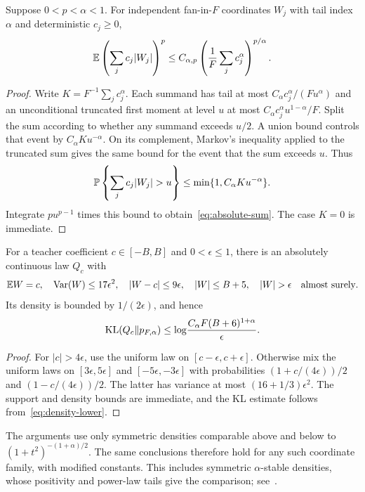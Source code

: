 \begin{lemma}\label{lem:absolute-sum}
Suppose $0<p<\alpha<1$. For independent fan-in-$F$ coordinates $W_j$ with tail index $\alpha$ and deterministic $c_j\ge0$,
\begin{equation}
 \mathbb E\left(\sum_j c_j|W_j|\right)^p
 \le C_{\alpha,p}\left(\frac1F\sum_j c_j^\alpha\right)^{p/\alpha}.
 \label{eq:absolute-sum}
\end{equation}
\end{lemma}
\begin{proof}
Write $K=F^{-1}\sum_jc_j^\alpha$. Each summand has tail at most $C_\alpha c_j^\alpha/(Fu^\alpha)$ and an unconditional truncated first moment at level $u$ at most $C_\alpha c_j^\alpha u^{1-\alpha}/F$. Split the sum according to whether any summand exceeds $u/2$. A union bound controls that event by $C_\alpha Ku^{-\alpha}$. On its complement, Markov's inequality applied to the truncated sum gives the same bound for the event that the sum exceeds $u$. Thus
\[
 \Pp\left\{\sum_jc_j|W_j|>u\right\}
 \le\min\{1,C_\alpha Ku^{-\alpha}\}.
\]
Integrate $pu^{p-1}$ times this bound to obtain~\eqref{eq:absolute-sum}. The case $K=0$ is immediate.
\end{proof}

\begin{lemma}\label{lem:distinguished}
For a teacher coefficient $c\in[-B,B]$ and $0<\epsilon\le1$, there is an absolutely continuous law $Q_c$ with
\[
 \E W=c,\quad \operatorname{Var}(W)\le17\epsilon^2,\quad
 |W-c|\le9\epsilon,\quad |W|\le B+5,\quad |W|>\epsilon
 \quad\text{almost surely}.
\]
Its density is bounded by $1/(2\epsilon)$, and hence
\[
 \operatorname{KL}(Q_c\|p_{F,\alpha})
 \le\log\!\frac{C_\alpha F(B+6)^{1+\alpha}}\epsilon.
\]
\end{lemma}
\begin{proof}
For $|c|>4\epsilon$, use the uniform law on $[c-\epsilon,c+\epsilon]$. Otherwise mix the uniform laws on $[3\epsilon,5\epsilon]$ and $[-5\epsilon,-3\epsilon]$ with probabilities $(1+c/(4\epsilon))/2$ and $(1-c/(4\epsilon))/2$. The latter has variance at most $(16+1/3)\epsilon^2$. The support and density bounds are immediate, and the KL estimate follows from~\eqref{eq:density-lower}.
\end{proof}

The arguments use only symmetric densities comparable above and below to $(1+t^2)^{-(1+\alpha)/2}$. The same conclusions therefore hold for any such coordinate family, with modified constants. This includes symmetric $\alpha$-stable densities, whose positivity and power-law tails give the comparison; see~\cite{zolotarev}.
